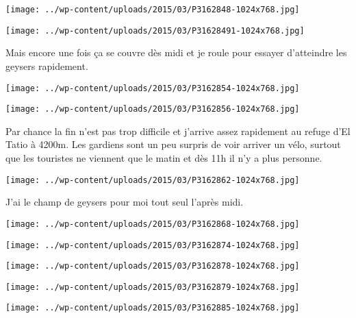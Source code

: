  \newline
 \newline
\centerline{\texttt{[image: ../wp-content/uploads/2015/03/P3162848-1024x768.jpg]} } 
 \newline
 \newline
\centerline{\texttt{[image: ../wp-content/uploads/2015/03/P31628491-1024x768.jpg]} } 
Mais encore une fois ça se couvre dès midi et je roule pour essayer d'atteindre les geysers rapidement. \newline
 \newline
\centerline{\texttt{[image: ../wp-content/uploads/2015/03/P3162854-1024x768.jpg]} } 
 \newline
 \newline
\centerline{\texttt{[image: ../wp-content/uploads/2015/03/P3162856-1024x768.jpg]} } 
 \newline
 Par chance la fin n'est pas trop difficile et j'arrive assez rapidement au refuge d'El Tatio à 4200m. \newline
 Les gardiens sont un peu surpris de voir arriver un vélo, surtout que les touristes ne viennent que le matin et dès 11h il n'y a plus personne. \newline
 \newline
\centerline{\texttt{[image: ../wp-content/uploads/2015/03/P3162862-1024x768.jpg]} } 
 \newline
 J'ai le champ de geysers pour moi tout seul l'après midi. \newline
 \newline
\centerline{\texttt{[image: ../wp-content/uploads/2015/03/P3162868-1024x768.jpg]} } 
 \newline
 \newline
\centerline{\texttt{[image: ../wp-content/uploads/2015/03/P3162874-1024x768.jpg]} } 
 \newline
 \newline
\centerline{\texttt{[image: ../wp-content/uploads/2015/03/P3162878-1024x768.jpg]} } 
 \newline
 \newline
\centerline{\texttt{[image: ../wp-content/uploads/2015/03/P3162879-1024x768.jpg]} } 
 \newline
 \newline
\centerline{\texttt{[image: ../wp-content/uploads/2015/03/P3162885-1024x768.jpg]} } 
 \newline
